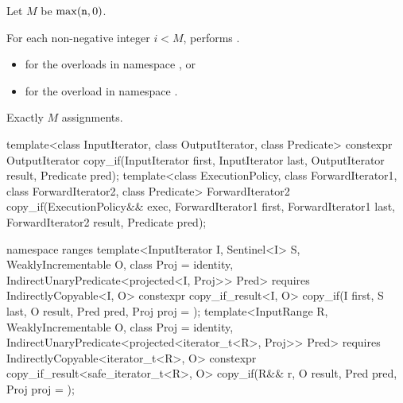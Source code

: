 \begin{itemdescr}
\pnum
Let $M$ be $\max(\texttt{n}, 0)$.

\pnum
\effects For each non-negative integer
$i < M$, performs .

\pnum
\returns
\begin{itemize}
\item
{} for the overloads in namespace , or
\item
{}
  for the overload in namespace .
\end{itemize}

\pnum
\complexity Exactly $M$ assignments.
\end{itemdescr}

%
\begin{itemdecl}
template<class InputIterator, class OutputIterator, class Predicate>
  constexpr OutputIterator copy_if(InputIterator first, InputIterator last,
                                   OutputIterator result, Predicate pred);
template<class ExecutionPolicy, class ForwardIterator1, class ForwardIterator2,
         class Predicate>
  ForwardIterator2 copy_if(ExecutionPolicy&& exec,
                           ForwardIterator1 first, ForwardIterator1 last,
                           ForwardIterator2 result, Predicate pred);

namespace ranges {
  template<InputIterator I, Sentinel<I> S, WeaklyIncrementable O, class Proj = identity,
      IndirectUnaryPredicate<projected<I, Proj>> Pred>
    requires IndirectlyCopyable<I, O>
    constexpr copy_if_result<I, O>
      copy_if(I first, S last, O result, Pred pred, Proj proj = {});
  template<InputRange R, WeaklyIncrementable O, class Proj = identity,
      IndirectUnaryPredicate<projected<iterator_t<R>, Proj>> Pred>
    requires IndirectlyCopyable<iterator_t<R>, O>
    constexpr copy_if_result<safe_iterator_t<R>, O>
      copy_if(R&& r, O result, Pred pred, Proj proj = {});
}
\end{itemdecl}

